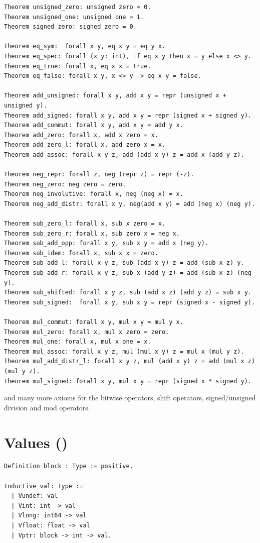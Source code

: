 \documentclass[12pt,fleqn,openany,oneside,showtrims]{memoir}
\newcommand{\ychapter}[2]{\chapter[#1]{#1 \hfill \normalsize #2}}
\begin{document}
\begin{lstlisting}
Theorem unsigned_zero: unsigned zero = 0.
Theorem unsigned_one: unsigned one = 1.
Theorem signed_zero: signed zero = 0.

Theorem eq_sym:  forall x y, eq x y = eq y x.
Theorem eq_spec: forall (x y: int), if eq x y then x = y else x <> y.
Theorem eq_true: forall x, eq x x = true.
Theorem eq_false: forall x y, x <> y -> eq x y = false.

Theorem add_unsigned: forall x y, add x y = repr (unsigned x + unsigned y).
Theorem add_signed: forall x y, add x y = repr (signed x + signed y).
Theorem add_commut: forall x y, add x y = add y x.
Theorem add_zero: forall x, add x zero = x.
Theorem add_zero_l: forall x, add zero x = x.
Theorem add_assoc: forall x y z, add (add x y) z = add x (add y z).

Theorem neg_repr: forall z, neg (repr z) = repr (-z).
Theorem neg_zero: neg zero = zero.
Theorem neg_involutive: forall x, neg (neg x) = x.
Theorem neg_add_distr: forall x y, neg(add x y) = add (neg x) (neg y).

Theorem sub_zero_l: forall x, sub x zero = x.
Theorem sub_zero_r: forall x, sub zero x = neg x.
Theorem sub_add_opp: forall x y, sub x y = add x (neg y).
Theorem sub_idem: forall x, sub x x = zero.
Theorem sub_add_l: forall x y z, sub (add x y) z = add (sub x z) y.
Theorem sub_add_r: forall x y z, sub x (add y z) = add (sub x z) (neg y).
Theorem sub_shifted: forall x y z, sub (add x z) (add y z) = sub x y.
Theorem sub_signed:  forall x y, sub x y = repr (signed x - signed y).

Theorem mul_commut: forall x y, mul x y = mul y x.
Theorem mul_zero: forall x, mul x zero = zero.
Theorem mul_one: forall x, mul x one = x.
Theorem mul_assoc: forall x y z, mul (mul x y) z = mul x (mul y z).
Theorem mul_add_distr_l: forall x y z, mul (add x y) z = add (mul x z) (mul y z).
Theorem mul_signed: forall x y, mul x y = repr (signed x * signed y).
\end{lstlisting}
and many more axioms for the bitwise operators, shift operators,
signed/unsigned division and mod operators.


\ychapter{Values}{()}

\begin{lstlisting}
Definition block : Type := positive.

Inductive val: Type :=
  | Vundef: val
  | Vint: int -> val
  | Vlong: int64 -> val
  | Vfloat: float -> val
  | Vptr: block -> int -> val.
\end{lstlisting}
\end{document}
